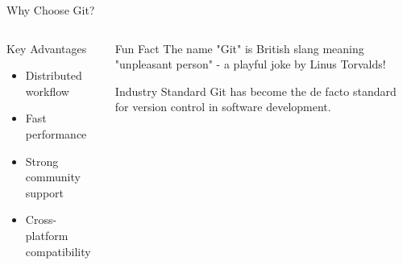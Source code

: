 \documentclass[aspectratio=169]{beamer}
\begin{document}
\begin{frame}{Why Choose Git?}
  \begin{columns}
    \begin{column}{0.48\textwidth}
      \begin{block}{Key Advantages}
        \begin{itemize}
          \item Distributed workflow
          \item Fast performance
          \item Strong community support
          \item Cross-platform compatibility
        \end{itemize}
      \end{block}
    \end{column}
    \begin{column}{0.48\textwidth}
      \begin{exampleblock}{Fun Fact}
        The name "Git" is British slang meaning "unpleasant person" - a playful joke by Linus Torvalds!
      \end{exampleblock}
      \vspace{0.5em}
      \begin{alertblock}{Industry Standard}
        Git has become the de facto standard for version control in software development.
      \end{alertblock}
    \end{column}
  \end{columns}
\end{frame}
\end{document}
